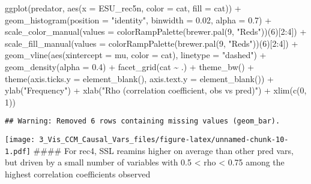 \documentclass[
]{article}
\newenvironment{Shaded}{\begin{snugshade}}{\end{snugshade}}
\newcommand{\AttributeTok}[1]{\textcolor[rgb]{0.77,0.63,0.00}{#1}}
\newcommand{\DecValTok}[1]{\textcolor[rgb]{0.00,0.00,0.81}{#1}}
\newcommand{\FloatTok}[1]{\textcolor[rgb]{0.00,0.00,0.81}{#1}}
\newcommand{\FunctionTok}[1]{\textcolor[rgb]{0.00,0.00,0.00}{#1}}
\newcommand{\NormalTok}[1]{#1}
\newcommand{\SpecialCharTok}[1]{\textcolor[rgb]{0.00,0.00,0.00}{#1}}
\newcommand{\StringTok}[1]{\textcolor[rgb]{0.31,0.60,0.02}{#1}}
\begin{document}
\begin{Shaded}
\begin{Highlighting}[]
\FunctionTok{ggplot}\NormalTok{(predator, }\FunctionTok{aes}\NormalTok{(}\AttributeTok{x =}\NormalTok{ ESU\_rec5n, }\AttributeTok{color =}\NormalTok{ cat, }\AttributeTok{fill =}\NormalTok{ cat)) }\SpecialCharTok{+} 
  \FunctionTok{geom\_histogram}\NormalTok{(}\AttributeTok{position =} \StringTok{"identity"}\NormalTok{, }\AttributeTok{binwidth =} \FloatTok{0.02}\NormalTok{, }\AttributeTok{alpha =} \FloatTok{0.7}\NormalTok{) }\SpecialCharTok{+}
  \FunctionTok{scale\_color\_manual}\NormalTok{(}\AttributeTok{values =} \FunctionTok{colorRampPalette}\NormalTok{(}\FunctionTok{brewer.pal}\NormalTok{(}\DecValTok{9}\NormalTok{, }\StringTok{"Reds"}\NormalTok{))(}\DecValTok{6}\NormalTok{)[}\DecValTok{2}\SpecialCharTok{:}\DecValTok{4}\NormalTok{]) }\SpecialCharTok{+}
  \FunctionTok{scale\_fill\_manual}\NormalTok{(}\AttributeTok{values =} \FunctionTok{colorRampPalette}\NormalTok{(}\FunctionTok{brewer.pal}\NormalTok{(}\DecValTok{9}\NormalTok{, }\StringTok{"Reds"}\NormalTok{))(}\DecValTok{6}\NormalTok{)[}\DecValTok{2}\SpecialCharTok{:}\DecValTok{4}\NormalTok{]) }\SpecialCharTok{+}
  \FunctionTok{geom\_vline}\NormalTok{(}\FunctionTok{aes}\NormalTok{(}\AttributeTok{xintercept =}\NormalTok{ mu, }\AttributeTok{color =}\NormalTok{ cat),}
             \AttributeTok{linetype =} \StringTok{"dashed"}\NormalTok{) }\SpecialCharTok{+}
  \FunctionTok{geom\_density}\NormalTok{(}\AttributeTok{alpha =} \FloatTok{0.4}\NormalTok{) }\SpecialCharTok{+} \FunctionTok{facet\_grid}\NormalTok{(cat }\SpecialCharTok{\textasciitilde{}}\NormalTok{ .) }\SpecialCharTok{+}
  \FunctionTok{theme\_bw}\NormalTok{() }\SpecialCharTok{+}
  \FunctionTok{theme}\NormalTok{(}\AttributeTok{axis.ticks.y =} \FunctionTok{element\_blank}\NormalTok{(),}
        \AttributeTok{axis.text.y =} \FunctionTok{element\_blank}\NormalTok{()) }\SpecialCharTok{+}
  \FunctionTok{ylab}\NormalTok{(}\StringTok{"Frequency"}\NormalTok{) }\SpecialCharTok{+} \FunctionTok{xlab}\NormalTok{(}\StringTok{"Rho (correlation coefficient, obs vs pred)"}\NormalTok{) }\SpecialCharTok{+}
  \FunctionTok{xlim}\NormalTok{(}\FunctionTok{c}\NormalTok{(}\DecValTok{0}\NormalTok{, }\DecValTok{1}\NormalTok{))}
\end{Highlighting}
\end{Shaded}

\begin{verbatim}
## Warning: Removed 6 rows containing missing values (geom_bar).
\end{verbatim}

\texttt{[image: 3\_Vis\_CCM\_Causal\_Vars\_files/figure-latex/unnamed-chunk-10-1.pdf]}
\#\#\#\# For rec4, SSL reamins higher on average than other pred vars,
but driven by a small number of variables with 0.5 \textless{} rho
\textless{} 0.75 among the highest correlation coefficients observed
\end{document}
